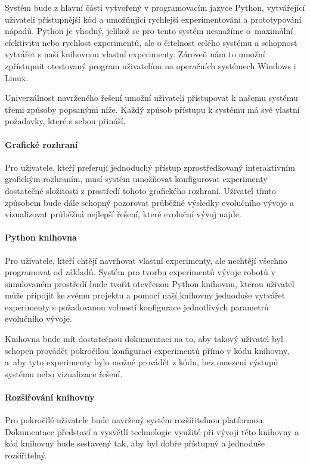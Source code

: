 Systém bude z hlavní části vytvořený v programovacím jazyce Python, vytvářející
uživateli přístupnější kód a umožňující rychlejší experimentování a
prototypování nápadů. Python je vhodný, jelikož se pro tento systém nesnažíme
o~maximální efektivitu nebo rychlost experimentů, ale o čitelnost celého
systému a schopnost vytvářet s naší knihovnou vlastní experimenty. Zároveň nám
to umožní zpřístupnit otestovaný program uživatelům na operačních systémech
Windows i Linux.

Univerzálnost navrženého řešení umožní uživateli přistupovat k našemu systému
třemi způsoby popsanými níže. Každý způsob přístupu k systému má své vlastní
požadavky, které s sebou přináší. 

\paragraph{Grafické rozhraní}
Pro uživatele, kteří preferují jednoduchý přístup zprostředkovaný interaktivním
grafickým rozhraním, musí systém umožňovat konfigurovat experimenty dostatečné
složitosti z prostředí tohoto grafického rozhraní. Uživatel tímto způsobem bude
dále schopný pozorovat průběžné výsledky evolučního vývoje a vizualizovat
průběžná nejlepší řešení, které evoluční vývoj najde.

\paragraph{Python knihovna}
Pro uživatele, kteří chtějí navrhovat vlastní experimenty, ale nechtějí všechno
programovat od základů. Systém pro tvorbu experimentů vývoje robotů v simulovaném prostředí bude tvořit
otevřenou Python knihovnu, kterou uživatel může připojit ke svému
projektu a pomocí naší knihovny jednoduše vytvářet experimenty s požadovanou
volností konfigurace jednotlivých parametrů evolučního vývoje.

Knihovna bude mít dostatečnou dokumentaci na to, aby takový uživatel byl
schopen provádět pokročilou konfiguraci experimentů přímo v kódu knihovny,
a~aby tyto experimenty bylo možné provádět z kódu, bez omezení výstupů systému
nebo vizualizace řešení.

\paragraph{Rozšiřování knihovny}
Pro pokročilé uživatele bude navržený systém rozšiřitelnou platformou. Dokumentace
představí a vysvětlí technologie využité při vývoji této knihovny a kód
knihovny bude sestavený tak, aby byl dobře přístupný a jednoduše rozšířitelný.
